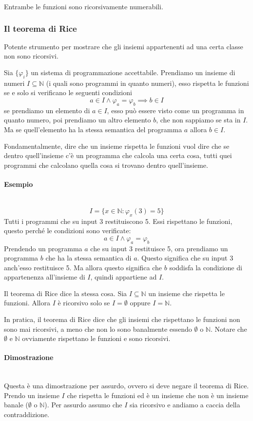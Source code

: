\documentclass{article}
\begin{document}
Entrambe le funzioni sono ricorsivamente numerabili.

\subsubsection{Il teorema di Rice}
Potente strumento per mostrare che gli insiemi appartenenti ad una certa classe non
sono ricorsivi.

Sia $\{\varphi_i\}$ un sistema di programmazione accettabile. Prendiamo un insieme di numeri
$I\subseteq\mathbb{N}$ (i quali sono programmi in quanto numeri),
esso rispetta le funzioni se e solo si verificano le seguenti condizioni
$$a\in I\land\varphi_a=\varphi_b\implies b\in I$$
se prendiamo un elemento di $a\in I$, esso può essere visto come un programma in quanto numero, poi
prendiamo un altro elemento $b$, che non sappiamo se sta in $I$. Ma se quell'elemento
ha la stessa semantica del programma $a$ allora $b\in I$.

Fondamentalmente, dire che un insieme rispetta le funzioni vuol dire che se dentro quell'insieme
c'è un programma che calcola una certa cosa, tutti quei programmi che calcolano quella cosa
si trovano dentro quell'insieme.

\paragraph{Esempio}\mbox{}\\
$$I=\{x\in\mathbb{N}:\varphi_x(3)=5\}$$
Tutti i programmi che su input 3 restituiscono 5. Essi rispettano le funzioni, questo
perché le condizioni sono verificate:
$$a\in I\land \varphi_a=\varphi_b$$
Prendendo un programma $a$ che su input 3 restituisce 5, ora prendiamo un programma
$b$ che ha la stessa semantica di $a$. Questo significa che su input 3 anch'esso restituisce
5. Ma allora questo significa che $b$ soddisfa la condizione di appartenenza all'insieme di
$I$, quindi appartiene ad $I$.

Il teorema di Rice dice la stessa cosa. Sia $I\subseteq\mathbb{N}$ un insieme che
rispetta le funzioni. Allora $I$ è ricorsivo solo se $I=\emptyset$ oppure $I=\mathbb{N}$.

In pratica, il teorema di Rice dice che gli insiemi che rispettano le funzioni non sono mai ricorsivi, a meno che
non lo sono banalmente essendo $\emptyset$ o $\mathbb{N}$. Notare che $\emptyset$ e $\mathbb{N}$
ovviamente rispettano le funzioni e sono ricorsivi.

\paragraph{Dimostrazione}\mbox{}\\
Questa è una dimostrazione per assurdo, ovvero si deve negare il teorema di Rice.
Prendo un insieme $I$ che rispetta le funzioni ed è un insieme che non è un insieme banale
($\emptyset$ o $\mathbb{N}$). Per assurdo assumo che $I$ sia ricorsivo e andiamo a caccia
della contraddizione.
\end{document}

